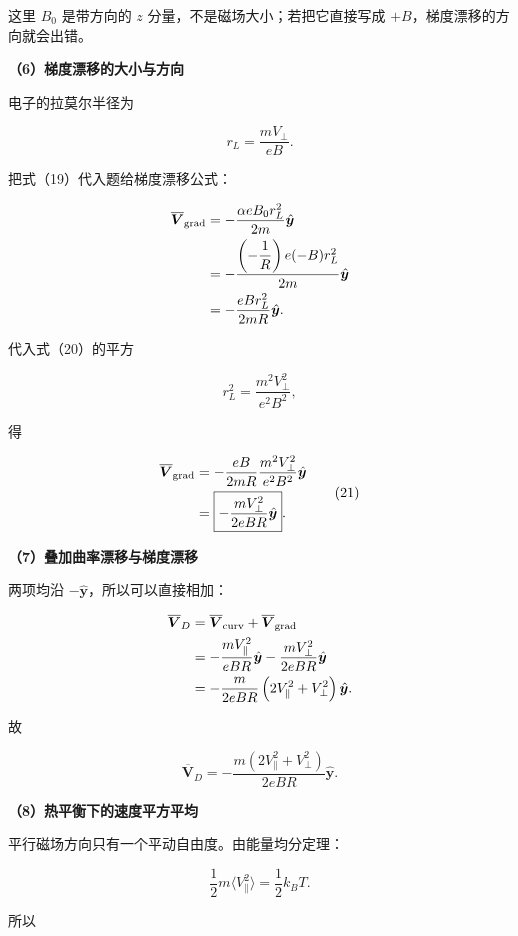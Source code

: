 \documentclass[12pt,a4paper,UTF8]{ctexart}
\begin{document}
这里 \(B_0\) 是带方向的 \(z\) 分量，不是磁场大小；若把它直接写成
\(+B\)，梯度漂移的方向就会出错。

\textbf{（6）梯度漂移的大小与方向}

电子的拉莫尔半径为

\[
r_L=\frac{mV_\perp}{eB}.
\tag{20}
\]

把式（19）代入题给梯度漂移公式：

\[
\begin{aligned}
\overline{\boldsymbol V}_{\rm grad}
&=-\frac{\alpha eB_0r_L^2}{2m}
\hat{\boldsymbol y}\\
&=-\frac{
\left(-\dfrac1R\right)e(-B)r_L^2
}{2m}\hat{\boldsymbol y}\\
&=-\frac{eBr_L^2}{2mR}
\hat{\boldsymbol y}.
\end{aligned}
\]

代入式（20）的平方

\[
r_L^2=\frac{m^2V_\perp^2}{e^2B^2},
\]

得

\[
\begin{aligned}
\overline{\boldsymbol V}_{\rm grad}
&=-\frac{eB}{2mR}
\frac{m^2V_\perp^2}{e^2B^2}
\hat{\boldsymbol y}\\
&=\boxed{
-\frac{mV_\perp^2}{2eBR}
\hat{\boldsymbol y}
}.
\end{aligned}
\tag{21}
\]

\textbf{（7）叠加曲率漂移与梯度漂移}

两项均沿 \(-\hat{\boldsymbol y}\)，所以可以直接相加：

\[
\begin{aligned}
\overline{\boldsymbol V}_{D}
&=\overline{\boldsymbol V}_{\rm curv}
+\overline{\boldsymbol V}_{\rm grad}\\
&=-\frac{mV_{\parallel}^2}{eBR}\hat{\boldsymbol y}
-\frac{mV_\perp^2}{2eBR}\hat{\boldsymbol y}\\
&=-\frac{m}{2eBR}
\left(2V_{\parallel}^2+V_\perp^2\right)
\hat{\boldsymbol y}.
\end{aligned}
\]

故

\[
\boxed{
\overline{\boldsymbol V}_{D}
=-\frac{m(2V_{\parallel}^2+V_\perp^2)}{2eBR}
\hat{\boldsymbol y}
}.
\tag{22}
\]

\textbf{（8）热平衡下的速度平方平均}

平行磁场方向只有一个平动自由度。由能量均分定理：

\[
\frac12m\langle V_{\parallel}^2\rangle
=\frac12k_BT.
\tag{23}
\]

所以
\end{document}
